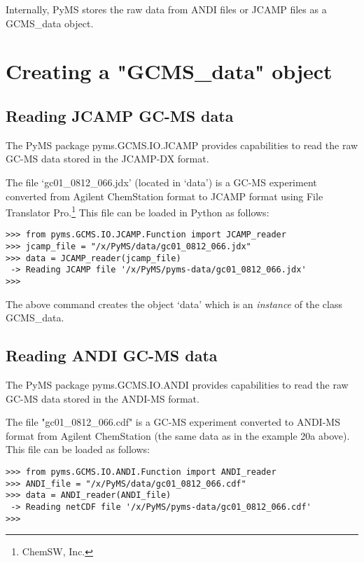 Internally, PyMS stores the raw data from ANDI files or JCAMP files as a
GCMS\_data object.

\section{Creating a "GCMS\_data" object}

\subsection{Reading JCAMP GC-MS data}


The PyMS package pyms.GCMS.IO.JCAMP provides capabilities to read the raw
GC-MS data stored in the JCAMP-DX format.

The file `gc01\_0812\_066.jdx' (located in `data') is a GC-MS experiment
converted from Agilent ChemStation format to JCAMP format using File
Translator Pro.\footnote{ChemSW, Inc.} This file can be loaded in Python
as follows:

\begin{verbatim}
>>> from pyms.GCMS.IO.JCAMP.Function import JCAMP_reader
>>> jcamp_file = "/x/PyMS/data/gc01_0812_066.jdx"
>>> data = JCAMP_reader(jcamp_file)
 -> Reading JCAMP file '/x/PyMS/pyms-data/gc01_0812_066.jdx'
>>>
\end{verbatim}

\noindent
The above command creates the object `data' which is an {\em instance}
of the class GCMS\_data.

\subsection{Reading ANDI GC-MS data}


The PyMS package pyms.GCMS.IO.ANDI provides capabilities to read the raw
GC-MS data stored in the ANDI-MS format.

The file "gc01\_0812\_066.cdf" is a GC-MS experiment converted to ANDI-MS
format from Agilent ChemStation (the same data as in the example 20a above).
This file can be loaded as follows:

\begin{verbatim}
>>> from pyms.GCMS.IO.ANDI.Function import ANDI_reader
>>> ANDI_file = "/x/PyMS/data/gc01_0812_066.cdf"
>>> data = ANDI_reader(ANDI_file)
 -> Reading netCDF file '/x/PyMS/pyms-data/gc01_0812_066.cdf'
>>>
\end{verbatim}

